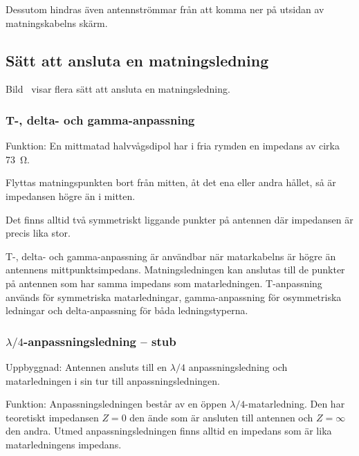 Dessutom hindras även antennströmmar från att komma ner på utsidan av
matningskabelns skärm.



\newpage
\subsection{Sätt att ansluta en matningsledning}

Bild~ visar flera sätt att ansluta en matningsledning.

\subsubsection{T-, delta- och gamma-anpassning}

Funktion:
En mittmatad halvvågsdipol har i fria rymden en impedans av cirka \qty{73}{\ohm}.

Flyttas matningspunkten bort från mitten, åt det ena eller andra hållet, så är
impedansen högre än i mitten.

Det finns alltid två symmetriskt liggande punkter på antennen där
impedansen är precis lika stor.

T-, delta- och gamma-anpassning är användbar när matarkabelns är högre
än antennens mittpunktsimpedans.
Matningsledningen kan anslutas till de punkter på antennen som har samma
impedans som matarledningen.
T-anpassning används för symmetriska matarledningar, gamma-anpassning för
osymmetriska ledningar och delta-anpassning för båda ledningstyperna.

\subsubsection{\(\lambda/4\)-anpassningsledning -- stub}

Uppbyggnad: Antennen ansluts till en \(\lambda/4\) anpassningsledning
och matarledningen i sin tur till anpassningsledningen.

Funktion: Anpassningsledningen består av en öppen \(\lambda/4\)-matarledning.
Den har teoretiskt impedansen \(Z = 0\) den ände som är ansluten till antennen
och \(Z = \infty\) den andra.
Utmed anpassningsledningen finns alltid en impedans som är lika matarledningens
impedans.

